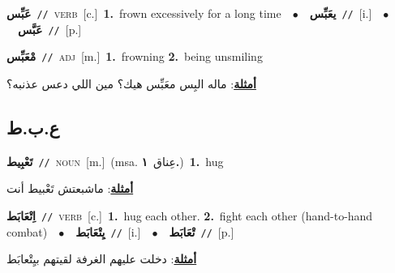 \documentclass[10pt,a4paper,twoside]{article} %
\begin{document}
\begin{multicols}{2}
{{{{{{{\setlength\topsep{0pt}\textbf{\foreignlanguage{arabic}{عَبِّس}}\ {\color{gray}\texttt{//}\color{black}}\ \textsc{verb}\ [c.]\ \textbf{1.}~frown excessively for a long time\ \ $\bullet$\ \ \setlength\topsep{0pt}\textbf{\foreignlanguage{arabic}{يعَبِّس}}\ {\color{gray}\texttt{//}\color{black}}\ [i.]\ \ $\bullet$\ \ \setlength\topsep{0pt}\textbf{\foreignlanguage{arabic}{عَبَّس}}\ {\color{gray}\texttt{//}\color{black}}\ [p.]\ 

{\setlength\topsep{0pt}\textbf{\foreignlanguage{arabic}{مْعَبِّس}}\ {\color{gray}\texttt{//}\color{black}}\ \textsc{adj}\ [m.]\ \textbf{1.}~frowning  \textbf{2.}~being unsmiling\  \begin{flushright}\color{gray}\foreignlanguage{arabic}{\textbf{\underline{\foreignlanguage{arabic}{أمثلة}}}: ماله البِس معَبِّس هيك؟ مين اللي دعس عذنبه؟}\end{flushright}\color{black}} \vspace{2mm}

\vspace{-3mm}
\subsection*{\color{blue}\foreignlanguage{arabic}{ع.ب.ط}\color{blue}{}} 

{\setlength\topsep{0pt}\textbf{\foreignlanguage{arabic}{تَعْبِيط}}\ {\color{gray}\texttt{//}\color{black}}\ \textsc{noun}\ [m.]\ \color{gray}(msa. \foreignlanguage{arabic}{عِناق}~\foreignlanguage{arabic}{\textbf{١.}})\color{black}\ \textbf{1.}~hug\  \begin{flushright}\color{gray}\foreignlanguage{arabic}{\textbf{\underline{\foreignlanguage{arabic}{أمثلة}}}: ماشبعتش تَعْبيط أنت}\end{flushright}\color{black}} \vspace{2mm}

{\setlength\topsep{0pt}\textbf{\foreignlanguage{arabic}{اِتْعَابَط}}\ {\color{gray}\texttt{//}\color{black}}\ \textsc{verb}\ [c.]\ \textbf{1.}~hug each other.  \textbf{2.}~fight each other (hand-to-hand combat)\ \ $\bullet$\ \ \setlength\topsep{0pt}\textbf{\foreignlanguage{arabic}{يِتْعَابَط}}\ {\color{gray}\texttt{//}\color{black}}\ [i.]\ \ $\bullet$\ \ \setlength\topsep{0pt}\textbf{\foreignlanguage{arabic}{تْعَابَط}}\ {\color{gray}\texttt{//}\color{black}}\ [p.]\  \begin{flushright}\color{gray}\foreignlanguage{arabic}{\textbf{\underline{\foreignlanguage{arabic}{أمثلة}}}: دخلت عليهم الغرفة لقيتهم بيِتْعابَط}\end{flushright}\color{black}} \vspace{2mm}

}}}}}}}
\end{multicols}
\end{document}
